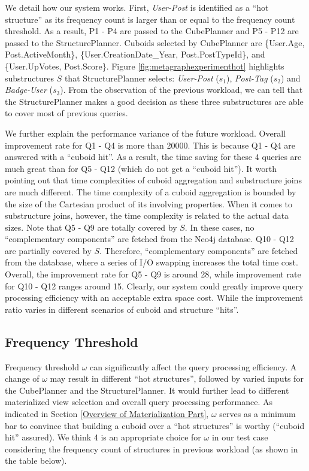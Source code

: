 We detail how our system works. First, \textit{User-Post} is identified as a ``hot structure'' as its frequency count is larger than or equal to the frequency count threshold. As a result, P1 - P4 are passed to the CubePlanner and P5 - P12 are passed to the StructurePlanner. Cuboids selected by CubePlanner are \{User.Age, Post.ActiveMonth\}, \{User.CreationDate\_Year, Post.PostTypeId\}, and \{User.UpVotes, Post.Score\}. Figure \ref{fig:metagraphexperimenthot} highlights substructures $S$ that StructurePlanner selects:  \textit{User-Post} ($s_1$), \textit{Post-Tag} ($s_2$) and \textit{Badge-User} ($s_3$). From the observation of the previous workload, we can tell that the StructurePlanner makes a good decision as these three substructures are able to cover most of previous queries.

We further explain the performance variance of the future workload. Overall improvement rate for Q1 - Q4 is more than 20000. This is because Q1 - Q4 are answered with a ``cuboid hit''. As a result, the time saving for these 4 queries are much great than for Q5 - Q12 (which do not get a ``cuboid hit''). It worth pointing out that time complexities of cuboid aggregation and substructure joins are much different. The time complexity of a cuboid aggregation is bounded by the size of the Cartesian product of its involving properties. When it comes to substructure joins, however, the time complexity is related to the actual data sizes. Note that Q5 - Q9 are totally covered by $S$. In these cases, no ``complementary components'' are fetched from the Neo4j database.  Q10 - Q12 are partially covered by $S$.  Therefore, ``complementary components'' are fetched from the database, where a series of I/O swapping increases the total time cost.  Overall, the improvement rate for Q5 - Q9 is around 28, while improvement rate for Q10 - Q12 ranges around 15. Clearly, our system could greatly improve query processing efficiency with an acceptable extra space cost. While the improvement ratio varies in different scenarios of cuboid and structure ``hits''.




\subsection{Frequency Threshold}
\label{Frequency Threshold}
Frequency threshold $\omega$ can significantly affect the query processing efficiency. A change of $\omega$ may result in different ``hot structures'', followed by varied inputs for the CubePlanner and the StructurePlanner. It would further lead to different materialized view selection and overall query processing performance. As indicated in Section \ref{Overview of Materialization Part}, $\omega$ serves as a minimum bar to convince that building a cuboid over a ``hot structures'' is worthy (``cuboid hit'' assured). We think 4 is an appropriate choice for $\omega$ in our test case considering the frequency count of structures in previous workload (as shown in the table below).

